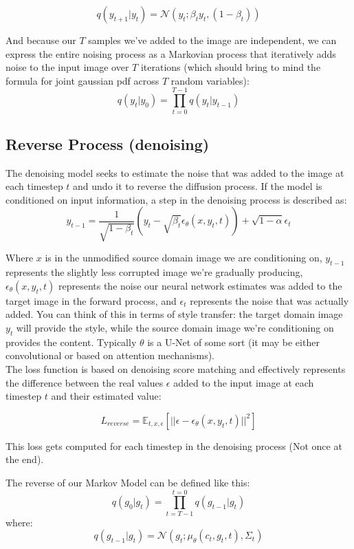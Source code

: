 \documentclass[12pt]{article}
\begin{document}
\[q(y_{t+1}|y_t) = \mathcal{N}(y_t; \beta_ty_t, (1-\beta_t))\]

And because our \(T\) samples we've added to the image are independent, we can express the entire noising process as a Markovian process that iteratively adds noise to the input image over \(T\) iterations (which should bring to mind the formula for joint gaussian pdf across \(T\) random variables):
\[q(y_t | y_{0}) = \prod_{t=0}^{T-1}q(y_t | y_{t-1})\]

\subsection{Reverse Process (denoising)}

The denoising model seeks to estimate the noise that was added to the image at each timestep \(t\) and undo it to reverse the diffusion process.   If the model is conditioned on input information, a step in the denoising process is described as: 
\[y_{t-1} = \frac{1}{\sqrt{1 - \beta_t}}\left(y_t - \sqrt{\beta_t}\epsilon_\theta(x, y_t, t) \right) + \sqrt{1-\alpha}\epsilon_t\]

Where \(x\) is in the unmodified source domain image we are conditioning on, \(y_{t-1}\) represents the slightly less corrupted image we're gradually producing, \(\epsilon_\theta(x, y_t, t)\) represents the noise our neural network estimates was added to the target image in the forward process, and \(\epsilon_t\) represents the noise that was actually added.  You can think of this in terms of style transfer: the target domain image \(y_t\) will provide the style, while the source domain image we're conditioning on provides the content. Typically \(\theta\) is a U-Net of some sort (it may be either convolutional or based on attention mechanisms).\\


The loss function is based on denoising score matching and effectively represents the difference between the real values \(\epsilon\) added to the input image at each timestep \(t\) and their estimated value:

\[L_{reverse} = \mathbb{E}_{t,x,\epsilon}\left[ || \epsilon - \epsilon_\theta(x,y_t, t) ||^2 \right]\]

This loss gets computed for each timestep in the denoising process (Not once at the end).


The reverse of our Markov Model can be defined like this: 
\[q(g_0 | g_{t}) = \prod_{t=T-1}^{t=0}q(g_{t-1} | g_t)\]
where:
\[q(g_{t-1} | g_t) = \mathcal{N}(g_t; \mu_\theta(c_t, g_t,t), \Sigma_t)\]
\end{document}

